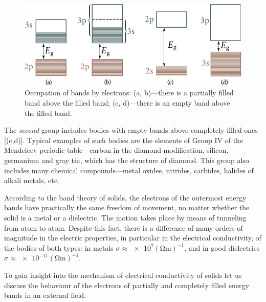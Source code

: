 \begin{figure}[t]
	\begin{center}
		\includegraphics[scale=1]{figures/ch_05/fig_5_13.pdf}
		\caption[]{Occupation of bands by electrons: (a, b)---there is a partially filled band above the filled band; (c, d)---there is an empty band above the filled band.}
		\label{fig:5_13}
	\end{center}
	\vspace{-0.7cm}
\end{figure}

The \textit{second} group includes bodies with empty bands above completely filled ones [(c,d)]. Typical examples of such bodies are the elements of Group IV of the Mendeleev periodic table---carbon in the diamond modification, silicon, germanium and gray tin, which has the structure of diamond. This group also includes many chemical compounds---metal oxides, nitrides, carbides, halides of alkali metals, etc.

According to the band theory of solids, the electrons of the outermost energy bands have practically the same freedom of movement, no matter whether the solid is a metal or a dielectric. The motion takes place by means of tunneling from atom to atom. Despite this fact, there is a difference of many orders of magnitude in the electric properties, in particular in the electrical conductivity, of the bodies of both types: in metals $\sigma\approx\num{e7}(\si{\ohm\metre})^{-1}$, and in good dielectrics $\sigma\approx\num{e-11}(\si{\ohm\metre})^{-1}$.

To gain insight into the mechanism of electrical conductivity of solids let us discuss the behaviour of the electrons of partially and completely filled energy bands in an external field.


